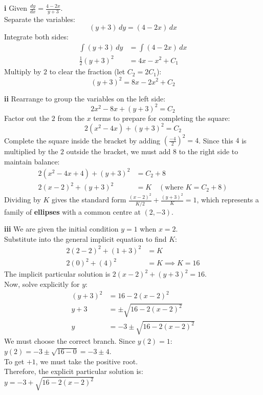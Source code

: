\begin{solution}
\textbf{i} Given $\frac{dy}{dx} = \frac{4 - 2x}{y + 3}$. \\
Separate the variables:
\[ (y + 3) \, dy = (4 - 2x) \, dx \]
Integrate both sides:
\begin{align*}
    \int (y + 3) \, dy &= \int (4 - 2x) \, dx \\
    \frac{1}{2}(y + 3)^2 &= 4x - x^2 + C_1
\end{align*}
Multiply by $2$ to clear the fraction (let $C_2 = 2C_1$):
\[ (y + 3)^2 = 8x - 2x^2 + C_2 \]

\vspace{0.3cm}
\textbf{ii} Rearrange to group the variables on the left side:
\[ 2x^2 - 8x + (y + 3)^2 = C_2 \]
Factor out the $2$ from the $x$ terms to prepare for completing the square:
\[ 2(x^2 - 4x) + (y + 3)^2 = C_2 \]
Complete the square inside the bracket by adding $(\frac{-4}{2})^2 = 4$. Since this $4$ is multiplied by the $2$ outside the bracket, we must add $8$ to the right side to maintain balance:
\begin{align*}
    2(x^2 - 4x + 4) + (y + 3)^2 &= C_2 + 8 \\
    2(x - 2)^2 + (y + 3)^2 &= K \quad (\text{where } K = C_2 + 8)
\end{align*}
Dividing by $K$ gives the standard form $\frac{(x-2)^2}{K/2} + \frac{(y+3)^2}{K} = 1$, which represents a family of \textbf{ellipses} with a common centre at \textbf{$(2, -3)$}.

\vspace{0.3cm}
\textbf{iii} We are given the initial condition $y=1$ when $x=2$. \\
Substitute into the general implicit equation to find $K$:
\begin{align*}
    2(2 - 2)^2 + (1 + 3)^2 &= K \\
    2(0)^2 + (4)^2 &= K \implies K = 16
\end{align*}
The implicit particular solution is $2(x - 2)^2 + (y + 3)^2 = 16$. \\
Now, solve explicitly for $y$:
\begin{align*}
    (y + 3)^2 &= 16 - 2(x - 2)^2 \\
    y + 3 &= \pm\sqrt{16 - 2(x - 2)^2} \\
    y &= -3 \pm\sqrt{16 - 2(x - 2)^2}
\end{align*}
We must choose the correct branch. Since $y(2) = 1$: \\
$y(2) = -3 \pm \sqrt{16 - 0} = -3 \pm 4$. \\
To get $+1$, we must take the positive root. \\
Therefore, the explicit particular solution is: \\
\textbf{$y = -3 + \sqrt{16 - 2(x - 2)^2}$}


\end{solution}
